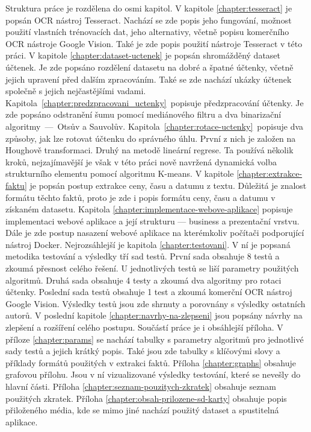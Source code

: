 \documentclass[thesis=B,czech]{FITthesis}[2019/12/23]
\begin{document}
\begin{introduction}
	Struktura práce je rozdělena do osmi kapitol. V kapitole \ref{chapter:tesseract} je popsán OCR nástroj Tesseract. Nachází se zde popis jeho fungování, možnost použití vlastních trénovacích dat, jeho alternativy, včetně popisu komerčního OCR nástroje Google Vision. Také je zde popis použití nástroje Tesseract v této práci. V kapitole	\ref{chapter:dataset-uctenek} je popsán shromážděný dataset účtenek. Je zde popsáno rozdělení datasetu na dobré a špatné účtenky, včetně jejich upravení před dalším zpracováním. Také se zde nachází ukázky účtenek společně s jejich nejčastějšími vadami. Kapitola~\ref{chapter:predzpracovani_uctenky}~popisuje předzpracování účtenky. Je zde popsáno odstranění šumu pomocí mediánového filtru a dva binarizační algoritmy~—~Otsův a Sauvolův. Kapitola~\ref{chapter:rotace-uctenky}~popisuje dva způsoby, jak lze rotovat účtenku do správného úhlu. První z nich je založen na Houghově transformaci. Druhý na metodě lineární regrese. Ta používá několik kroků, nejzajímavější je však v této práci nově navržená dynamická volba strukturního elementu pomocí algoritmu K-means. V kapitole \ref{chapter:extrakce-faktu} je popsán postup extrakce ceny, času a datumu z textu. Důležitá je znalost formátu těchto faktů, proto je zde i popis formátu ceny, času a datumu v získaném datasetu. Kapitola \ref{chapter:implementace-webove-aplikace} popisuje implementaci webové aplikace a její strukturu — business a prezentační vrstvu. Dále je zde postup nasazení webové aplikace na kterémkoliv počítači podporující nástroj Docker. Nejrozsáhlejší je kapitola \ref{chapter:testovani}. V ní je popsaná metodika testování a výsledky tří sad testů. První sada obsahuje 8 testů a zkoumá přesnost celého řešení. U jednotlivých testů se liší parametry použitých algoritmů. Druhá sada obsahuje 4 testy a zkoumá dva algoritmy pro rotaci účtenky. Poslední sada testů obsahuje 1 test a zkoumá komerční OCR nástroj Google Vision. Výsledky testů jsou zde shrnuty a porovnány s výsledky ostatních autorů. V poslední kapitole \ref{chapter:navrhy-na-zlepseni} jsou popsány návrhy na zlepšení a rozšíření celého postupu. Součástí práce je i obsáhlejší příloha. V příloze \ref{chapter:params} se nachází tabulky s parametry algoritmů pro jednotlivé sady testů a jejich krátký popis. Také jsou zde tabulky s klíčovými slovy a příklady formátů použitých v extrakci faktů. Příloha \ref{chapter:graphs} obsahuje grafovou přílohu. Jsou v ní vizualizované výsledky testování, které se nevešly do hlavní části. Příloha \ref{chapter:seznam-pouzitych-zkratek} obsahuje seznam použitých zkratek. Příloha \ref{chapter:obsah-prilozene-sd-karty} obsahuje popis přiloženého média, kde se mimo jiné nachází použitý dataset a spustitelná aplikace.
\end{introduction}
\end{document}
